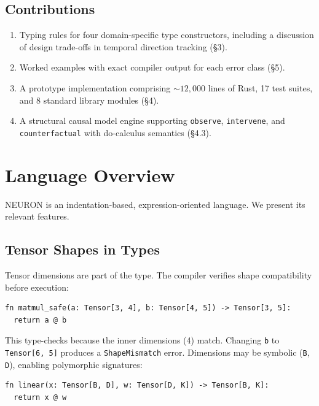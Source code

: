 \documentclass[11pt,a4paper]{article}
\newcommand{\ty}[1]{\texttt{#1}}
\begin{document}
\subsection{Contributions}

\begin{enumerate}[itemsep=2pt]
  \item Typing rules for four domain-specific type constructors, including a discussion of design trade-offs in temporal direction tracking (\S3).
  \item Worked examples with exact compiler output for each error class (\S5).
  \item A prototype implementation comprising ${\sim}12{,}000$ lines of Rust, 17 test suites, and 8 standard library modules (\S4).
  \item A structural causal model engine supporting \ty{observe}, \ty{intervene}, and \ty{counterfactual} with do-calculus semantics (\S4.3).
\end{enumerate}


\section{Language Overview}

NEURON is an indentation-based, expression-oriented language. We present its relevant features.

\subsection{Tensor Shapes in Types}

Tensor dimensions are part of the type. The compiler verifies shape compatibility before execution:

\begin{lstlisting}
fn matmul_safe(a: Tensor[3, 4], b: Tensor[4, 5]) -> Tensor[3, 5]:
  return a @ b
\end{lstlisting}

This type-checks because the inner dimensions (4) match. Changing \ty{b} to \ty{Tensor[6, 5]} produces a \ty{ShapeMismatch} error. Dimensions may be symbolic (\ty{B}, \ty{D}), enabling polymorphic signatures:

\begin{lstlisting}
fn linear(x: Tensor[B, D], w: Tensor[D, K]) -> Tensor[B, K]:
  return x @ w
\end{lstlisting}
\end{document}
